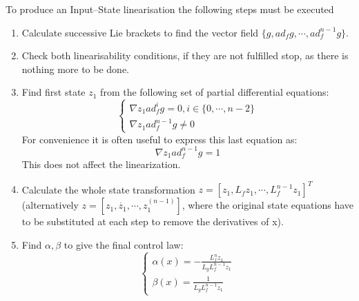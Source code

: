 {
    To produce an Input--State linearisation the following steps must be executed
    \begin{enumerate}
        \item Calculate successive Lie brackets to find the vector field $\{g,ad_fg,\cdots ,ad_f^{n-1}g\}$.
        \item Check both linearisability conditions, if they are not fulfilled stop, as there is nothing more to be done.
        \item Find first state $z_1$ from the following set of partial differential equations:
            \begin{equation}
                \label{zfnd}
                \begin{cases}
                    \nabla z_1 ad_f^{i}g = 0, i\in\{0,\cdots ,n-2\} \\
                    \nabla z_1 ad_f^{n-1}g \neq 0
                \end{cases}
            \end{equation}
            \nt
            {
                For convenience it is often useful to express this last equation as:
                \begin{equation}
                    \nabla z_1 ad_f^{n-1}g = 1
                \end{equation}
                This does not affect the linearization.
            }
        \item Calculate the whole state transformation $z = [z_1,L_fz_1,\cdots ,L_f^{n-1}z_1]^{T}$ (alternatively $z = [z_1,\dot{z_1},\cdots ,z_1^{(n-1)}]$, where the original state equations have to be substituted at each step to remove the derivatives of x).
        \item Find $\alpha, \beta$ to give the final control law:
             \begin{equation}
                \begin{cases}
                    \alpha(x) = - \frac{L_f^{n}z_1}{L_gL_f^{n-1}z_1}\\
                    \beta(x) = \frac{1}{L_gL_f^{n-1}z_1}
                \end{cases}
            \end{equation}
    \end{enumerate}
    }
        
